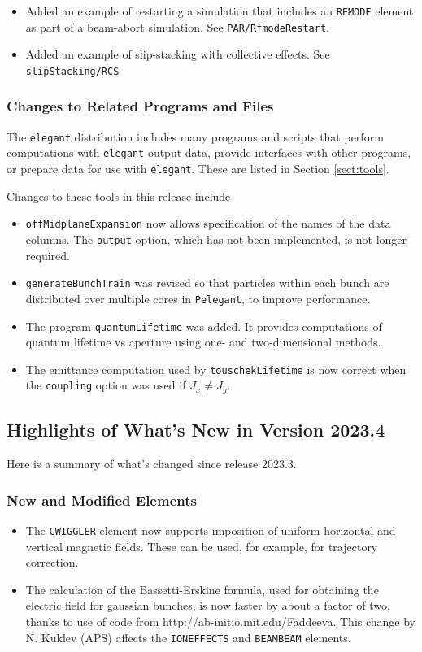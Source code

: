\documentclass[11pt]{article}
\begin{document}
\begin{itemize}
\item Added an example of restarting a simulation that includes an \verb|RFMODE| element as part of a beam-abort
  simulation. See \verb|PAR/RfmodeRestart|.
\item Added an example of slip-stacking with collective effects. See \verb|slipStacking/RCS|
\end{itemize}

\subsubsection{Changes to Related Programs and Files}

The {\tt elegant} distribution includes many programs and scripts that perform computations with {\tt elegant}
output data, provide interfaces with other programs, or prepare data for use with {\tt elegant}. These
are listed in Section \ref{sect:tools}. 

Changes to these tools in this release include
\begin{itemize}
\item \verb|offMidplaneExpansion| now allows specification of the names of the data columns.
  The \verb|output| option, which has not been implemented, is not longer required.
\item \verb|generateBunchTrain| was revised so that particles within each bunch are distributed
  over multiple cores in \verb|Pelegant|, to improve performance.
\item The program \verb|quantumLifetime| was added. It provides computations of quantum lifetime vs
  aperture using one- and two-dimensional methods.
\item The emittance computation used by \verb|touschekLifetime| is now correct when the \verb|coupling|
  option was used if $J_x\neq J_y$.
\end{itemize}


\subsection{Highlights of What's New in Version 2023.4}

Here is a summary of what's changed since release 2023.3.

\subsubsection{New and Modified Elements}
\begin{itemize}
\item The \verb|CWIGGLER| element now supports imposition of uniform horizontal and vertical magnetic fields.
  These can be used, for example, for trajectory correction.
\item The calculation of the Bassetti-Erskine formula, used for obtaining the electric field for gaussian bunches, is
  now faster by about a factor of two, thanks to use of code from http://ab-initio.mit.edu/Faddeeva. This change by
  N. Kuklev (APS) affects the \verb|IONEFFECTS| and \verb|BEAMBEAM| elements.
\end{itemize}
\end{document}
